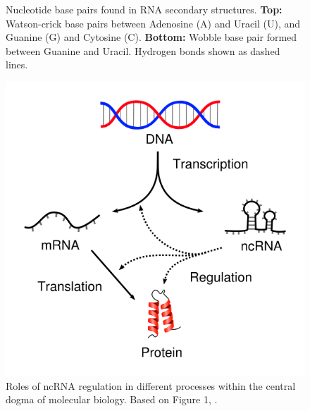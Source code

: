 \begin{figure}[H]
\begin{minipage}[b]{0.47\linewidth}
  \centering
  \caption[Nucleotide base pairs found in RNA secondary structures]{Nucleotide base pairs found in RNA secondary structures. \textbf{Top:} Watson-crick base pairs between Adenosine (A) and Uracil (U), and Guanine (G) and Cytosine (C). \textbf{Bottom:} Wobble base pair formed between Guanine and Uracil. Hydrogen bonds shown as dashed lines.}
  \label{fig:basepairs}
    \end{minipage}
\quad
    \begin{minipage}[b]{0.47\linewidth}
        \centering
          \includegraphics[scale=1.4]{intro/central_dogma.png}
  \caption[Roles of ncRNA regulation in different processes within the central dogma of molecular biology]{Roles of ncRNA regulation in different processes within the central dogma of molecular biology. Based on Figure 1, \cite{Wahlestedt2013-so}. }
  \label{fig:central_dogma}
        \par


\end{minipage}
\end{figure}

